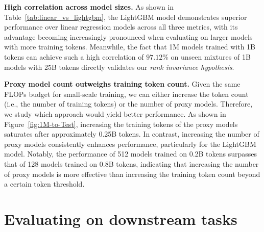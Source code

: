 \documentclass{article}
\theoremstyle{definition}
\theoremstyle{remark}
\begin{document}
\textbf{High correlation across model sizes.}\;\;
As shown in Table~\ref{tab:linear_vs_lightgbm}, the LightGBM model demonstrates superior performance over linear regression models across all three metrics, with its advantage becoming increasingly pronounced when evaluating on larger models with more training tokens.
Meanwhile, the fact that 1M models trained with 1B tokens can achieve such a high correlation of $97.12$\% on unseen mixtures of 1B models with 25B tokens directly validates our \textit{rank invariance hypothesis}. 

\textbf{Proxy model count outweighs training token count.}\;\;
Given the same FLOPs budget for small-scale training, we can either increase the token count (i.e., the number of training tokens) or the number of proxy models. Therefore, we study which approach would yield better performance.
As shown in Figure~\ref{fig:1M-to-Test}, increasing the training tokens of the proxy models saturates after approximately 0.25B tokens.
In contrast, increasing the number of proxy models consistently enhances performance, particularly for the LightGBM model.
Notably, the performance of 512 models trained on 0.2B tokens surpasses that of 128 models trained on 0.8B tokens, indicating that increasing the number of proxy models is more effective than increasing the training token count beyond a certain token threshold. 

\section{Evaluating on downstream tasks}
\label{sec:app}
\end{document}
